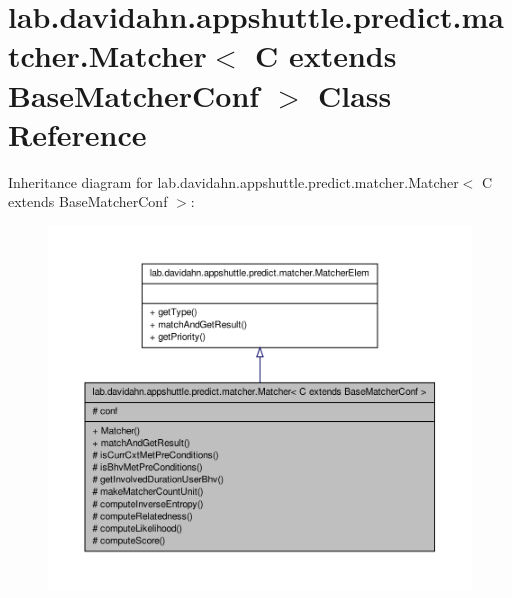 \hypertarget{classlab_1_1davidahn_1_1appshuttle_1_1predict_1_1matcher_1_1_matcher_3_01_c_01extends_01_base_matcher_conf_01_4}{\section{lab.\-davidahn.\-appshuttle.\-predict.\-matcher.\-Matcher$<$ \-C extends \-Base\-Matcher\-Conf $>$ \-Class \-Reference}
\label{classlab_1_1davidahn_1_1appshuttle_1_1predict_1_1matcher_1_1_matcher_3_01_c_01extends_01_base_matcher_conf_01_4}
}


\-Inheritance diagram for lab.\-davidahn.\-appshuttle.\-predict.\-matcher.\-Matcher$<$ \-C extends \-Base\-Matcher\-Conf $>$\-:
\nopagebreak
\begin{figure}[H]
\begin{center}
\leavevmode
\includegraphics[width=350pt]{classlab_1_1davidahn_1_1appshuttle_1_1predict_1_1matcher_1_1_matcher_3_01_c_01extends_01_base_matcher_conf_01_4__inherit__graph}
\end{center}
\end{figure}


